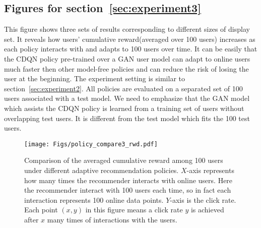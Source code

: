 \documentclass{article} %
\begin{document}
\subsection{Figures for section~\ref{sec:experiment3}}\label{app:exp_policy3}
This figure shows three sets of results corresponding to different sizes of display set. It reveals how users' cumulative reward(averaged over 100 users) increases as each policy interacts with and adapts to 100 users over time. It can be easily that the CDQN policy pre-trained over a GAN user model can adapt to online users much faster then other model-free policies and can reduce the risk of losing the user at the beginning. The experiment setting is similar to section~\ref{sec:experiment2}. All policies are evaluated on a separated set of 100 users associated with a test model. We need to emphasize that the GAN model which assists the CDQN policy is learned from a training set of users without overlapping test users. It is different from the test model which fits the 100 test users.
\begin{figure}[htbp]
    \centering
    \texttt{[image: Figs/policy\_compare3\_rwd.pdf]}
\caption{\small Comparison of the averaged cumulative reward among 100 users under different adaptive recommendation policies. $X$-axis represents how many times the recommender interacts with online users. Here the recommender interact with 100 users each time, so in fact each interaction represents 100 online data points. $Y$-axis is the click rate. Each point $(x,y)$ in this figure means a click rate $y$ is achieved after $x$ many times of interactions with the users. }
\end{figure}
\end{document}
